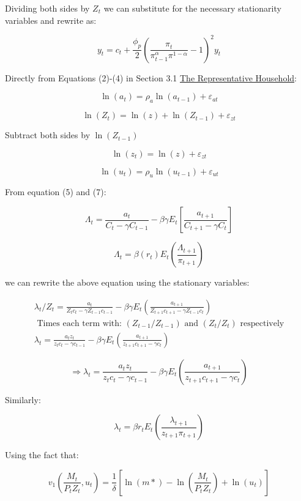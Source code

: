 \documentclass[11pt,preprint, authoryear]{elsarticle}
\numberwithin{equation}{section}
\numberwithin{figure}{section}
\numberwithin{table}{section}
\begin{document}
Dividing both sides by \(Z_t\) we can substitute for the necessary
stationarity variables and rewrite as:

\[y_{t}=c_{t}+\frac{\phi_{p}}{2}\left(\frac{\pi_{t}}{\pi_{t-1}^{\alpha} \pi^{1-\alpha}}-1\right)^{2} y_{t} \tag{1*}\]

Directly from Equations (2)-(4) in Section 3.1
\protect\hyperlink{the-representative-household}{The Representative
Household}:

\[\ln \left(a_{t}\right)=\rho_{a} \ln \left(a_{t-1}\right)+\varepsilon_{a t} \tag{2*}\]

\[\ln \left(Z_{t}\right)=\ln (z) + \ln(Z_{t-1}) +\varepsilon_{z t}\]

Subtract both sides by \(\ln(Z_{t-1})\)

\[\ln \left(z_{t}\right)=\ln (z)+\varepsilon_{z t} \tag{3*}\]

\[\ln \left(u_{t}\right)=\rho_{u} \ln \left(u_{t-1}\right)+\varepsilon_{u t} \tag{4*} \]

From equation (5) and (7):

\[\Lambda_t = \frac{a_t}{C_t-\gamma C_{t-1}} - \beta \gamma E_t \left[ \frac{a_{t+1}}{C_{t+1} - \gamma C_t} \right] \tag{5}\]

\[\Lambda_t = \beta(r_t)E_t(\frac{\Lambda_{t+1}}{\pi_{t+1}}) \tag{7}\]

we can rewrite the above equation using the stationary variables:

\[\begin{aligned}
\lambda_{t} / Z_t =\frac{a_{t}}{Z_{t} c_{t}-\gamma Z_{t-1} c_{t-1}}-\beta \gamma E_{t} \left(\frac{a_{t+1}}{Z_{t+1} c_{t+1}-\gamma Z_{t-1} c_{t}} \right)\\
\text{ Times each term with: } \left(Z_{t-1} / Z_{t-1}\right) \text{ and } (Z_{t} / Z_{t}) \text{ respectively} \\
\lambda_{t} =\frac{a_{t} z_{t}}{z_{t} c_{t}-\gamma c_{t-1}}-\beta \gamma E_{t}\left(\frac{a_{t+1}}{z_{t+1} c_{t+1}-\gamma c_{t}}\right)
\end{aligned}\]

\[\Rightarrow \lambda_{t}=\frac{a_{t}z_{t}}{z_{t} c_{t}-\gamma c_{t-1}}-\beta \gamma E_{t}\left(\frac{a_{t+1}}{z_{t+1} c_{t+1}-\gamma c_{t}}\right) \tag{5*}\]

Similarly:

\[\lambda_{t}=\beta r_{t} E_{t}\left(\frac{\lambda_{t+1}}{z_{t+1} \pi_{t+1}}\right) \tag{7*}\]

Using the fact that:

\[v_1(\frac{M_t}{P_tZ_t},u_t) = \frac{1}{\delta}[\ln(m*) - \ln(\frac{M_t}{P_tZ_t}) + \ln(u_t)]\]
\end{document}
